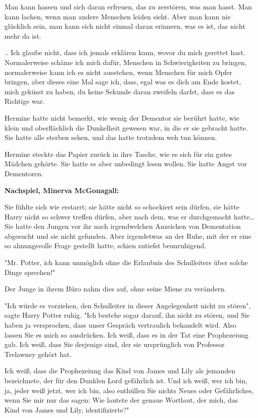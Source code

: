 {{Man kann hassen und sich daran erfreuen, das zu zerstören, was man hasst. Man kann lachen, wenn man andere Menschen leiden sieht. Aber man kann nie glücklich sein, man kann sich nicht einmal daran erinnern, was es ist, das nicht mehr da ist.

.. Ich glaube nicht, dass ich jemals erklären kann, wovor du mich gerettet hast. Normalerweise schäme ich mich dafür, Menschen in Schwierigkeiten zu bringen, normalerweise kann ich es nicht ausstehen, wenn Menschen für mich Opfer bringen, aber dieses eine Mal sage ich, dass, egal was es dich am Ende kostet, mich geküsst zu haben, du keine Sekunde daran zweifeln darfst, dass es das Richtige war.}

Hermine hatte nicht bemerkt, wie wenig der Dementor sie berührt hatte, wie klein und oberflächlich die Dunkelheit gewesen war, in die er sie gebracht hatte. Sie hatte alle sterben sehen, und das hatte trotzdem weh tun können.

Hermine steckte das Papier zurück in ihre Tasche, wie es sich für ein gutes Mädchen gehörte. Sie hatte es aber unbedingt lesen wollen. Sie hatte Angst vor Dementoren.

\textbf{Nachspiel, Minerva McGonagall:}

Sie fühlte sich wie erstarrt; sie hätte nicht so schockiert sein dürfen, sie hätte Harry nicht so schwer treffen dürfen, aber nach dem, was er durchgemacht hatte… Sie hatte den Jungen vor ihr nach irgendwelchen Anzeichen von Dementation abgesucht und sie nicht gefunden. Aber irgendetwas an der Ruhe, mit der er eine so ahnungsvolle Frage gestellt hatte, schien zutiefst beunruhigend.

"Mr. Potter, ich kann unmöglich ohne die Erlaubnis des Schulleiters über solche Dinge sprechen!"

Der Junge in ihrem Büro nahm dies auf, ohne seine Miene zu verändern.

"Ich würde es vorziehen, den Schulleiter in dieser Angelegenheit nicht zu stören", sagte Harry Potter ruhig. "Ich bestehe sogar darauf, ihn nicht zu stören, und Sie haben ja versprochen, dass unser Gespräch vertraulich behandelt wird. Also lassen Sie es mich so ausdrücken. Ich weiß, dass es in der Tat eine Prophezeiung gab. Ich weiß, dass Sie derjenige sind, der sie ursprünglich von Professor Trelawney gehört hat.

Ich weiß, dass die Prophezeiung das Kind von James und Lily als jemanden bezeichnete, der für den Dunklen Lord gefährlich ist. Und ich weiß, wer ich bin, ja, jeder weiß jetzt, wer ich bin, also enthüllen Sie nichts Neues oder Gefährliches, wenn Sie mir nur das sagen: Wie lautete der genaue Wortlaut, der mich, das Kind von James und Lily, identifizierte?"

}
